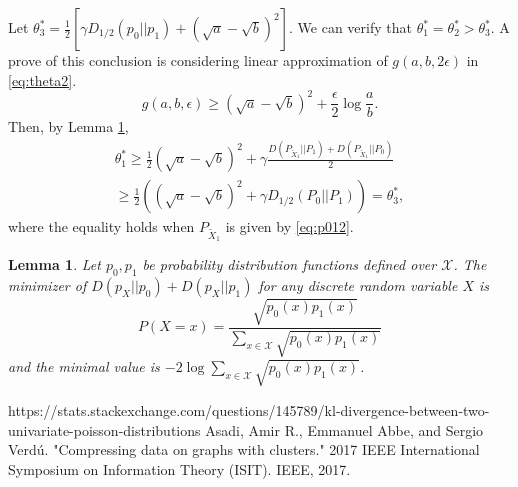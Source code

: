 \documentclass{article}
\newtheorem{lemma}{Lemma}
\begin{document}
Let $\theta^*_3 = \frac{1}{2}[\gamma D_{1/2}(p_0||p_1) + (\sqrt{a} - \sqrt{b})^2]$.
We can verify that $\theta_1^*=\theta_2^*>\theta^*_3$.
A prove of this conclusion is considering
linear approximation of $g(a,b,2\epsilon)$
in \eqref{eq:theta2}.
\begin{equation}\label{eq:g_linear}
		g(a,b,\epsilon) \geq  (\sqrt{a} - \sqrt{b})^2 + \frac{\epsilon}{2}\log \frac{a}{b}. 
	\end{equation}
	Then, by Lemma \ref{lem:p0p12},
	\begin{align*}
		\theta^*_1 \geq \frac{1}{2}(\sqrt{a}-\sqrt{b})^2+\gamma \frac{D(P_{\widetilde{X}_1} || P_1) + D(P_{\widetilde{X}_1} || P_0)}{2} \\
		\geq \frac{1}{2}((\sqrt{a}-\sqrt{b})^2+\gamma D_{1/2}(P_0||P_1))=\theta^*_3,
	\end{align*}
	where the equality holds when $P_{\widetilde{X}_1}$ is given by \eqref{eq:p012}. 
	\begin{lemma}\label{lem:p0p12}
		Let $p_0, p_1$ be probability distribution functions defined over $\mathcal{X}$. The minimizer
		of $D(p_X||p_0) + D(p_X||p_1)$ for any discrete random variable $X$ is
		\begin{equation}\label{eq:p012}
			P(X=x)=\frac{\sqrt{p_0(x)p_1(x)}}{ \sum_{x\in \mathcal{X}} \sqrt{p_0(x) p_1(x)}}
		\end{equation}
		and the minimal value is
		$-2\log \sum_{x\in \mathcal{X}} \sqrt{p_0(x) p_1(x)}$.
	\end{lemma}
\begin{thebibliography}{9}
 https://stats.stackexchange.com/questions/145789/kl-divergence-between-two-univariate-poisson-distributions
 Asadi, Amir R., Emmanuel Abbe, and Sergio Verdú. "Compressing data on graphs with clusters." 2017 IEEE International Symposium on Information Theory (ISIT). IEEE, 2017.
\end{thebibliography}
\end{document}
